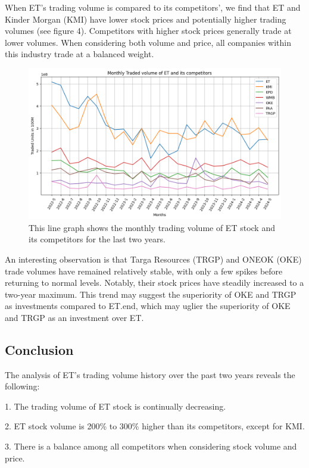 \documentclass[9pt,a4paper,twoside]{tau}
\begin{document}
    When ET's trading volume is compared to its competitors', we find that ET and Kinder Morgan (KMI) have lower stock prices and potentially higher trading volumes (see figure 4). Competitors with higher stock prices generally trade at lower volumes. When considering both volume and price, all companies within this industry trade at a balanced weight.

    \begin{figure}[H]
        \centering
        \includegraphics[width=0.85\columnwidth]{Figures/MonthlyTradedVolumeOfETvsCompetitors.png}
        \caption{This line graph shows the monthly trading volume of ET stock and its competitors for the last two years\cite{yahoo-finance-2024}.}
        \label{fig:figure}
    \end{figure}

    An interesting observation is that Targa Resources (TRGP) and ONEOK (OKE) trade volumes have remained relatively stable, with only a few spikes before returning to normal levels. Notably, their stock prices have steadily increased to a two-year maximum. This trend may suggest the superiority of OKE and TRGP as investments compared to ET.end, which may uglier the superiority of OKE and TRGP as an investment over ET. 

    \subsection{Conclusion}

        The analysis of ET's trading volume history over the past two years reveals the following: 
        
        1. The trading volume of ET stock is continually decreasing.

        2. ET stock volume is 200\% to 300\% higher than its competitors, except for KMI.
        
        3. There is a balance among all competitors when considering stock volume and price.
        
\end{document}
